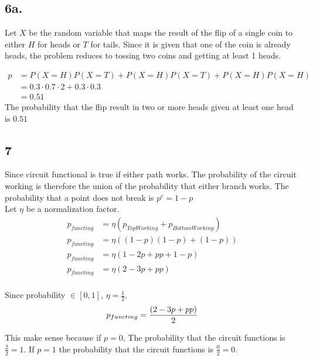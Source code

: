 \documentclass{article}
\begin{document}
\subsection*{6a.}
Let $X$ be the random variable that maps the result of the flip of a single coin
to either $H$ for heads or $T$ for tails.
Since it is given that one of the coin is already heads, the problem reduces to
tossing two coins and getting at least 1 heads.

\begin{align*}
p &= P(X=H)P(X=T) + P(X=H)P(X=T) + P(X=H)P(X=H) \\
  &= 0.3 \cdot 0.7 \cdot 2 + 0.3 \cdot 0.3 \\
	&= 0.51
\end{align*}
The probability that the flip result in two or more heads given at least one
head is $0.51$

\subsection*{7}
Since circuit functional is true if either path works. The probability of the
circuit working is therefore the union of the probability that either branch
works. The probability that a point does not break is $p^c = 1-p$\\
Let $\eta$ be a normalization factor.
\begin{align*}
p_{functing} &= \eta (p_{TopWorking} + p_{BottomWorking})\\
p_{functing} &= \eta((1-p)(1-p) + (1-p)) \\
p_{functing} &= \eta(1 - 2p + pp + 1 - p)\\
p_{functing} &= \eta(2 - 3p + pp)\\
\end{align*}

Since probability $\in [0,1]$, $\eta = \frac{1}{2}$.
$$
p_{functing} = \frac{(2 - 3p + pp)}{2}\\
$$

This make sense because if $p=0$, The probability that the circuit functions is
$\frac{2}{2} = 1$. If $p=1$ the probability that the circuit functions is
$\frac{0}{2} = 0$.
\end{document}
